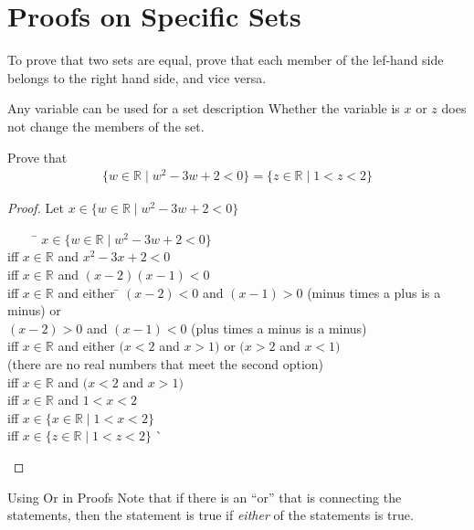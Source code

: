 \documentclass[../notes.tex]{subfiles}
\begin{document}
		\section{Proofs on Specific Sets}
			To prove that two sets are equal, prove that each member of the lef-hand side belongs to the right hand side, and vice versa.
			\begin{sidenote}{Any variable can be used for a set description}
				Whether the variable is $x$ or $z$ does not change the members of the set.
			\end{sidenote}
			\begin{example}
				Prove that
				\begin{align*}
					\{w \in \mathbb{R} \mid w^{2} - 3w + 2 < 0\} = \{z \in \mathbb{R} \mid 1 < z < 2\}
				\end{align*}
				\begin{proof}
					Let $x \in \{w \in \mathbb{R} \mid w^{2} - 3w + 2 < 0\}$
					\begin{tabbing}
						$\qquad$ \= $x \in \{w \in \mathbb{R} \mid w^{2} - 3w + 2 < 0\}$\\
						iff      \> $x \in \mathbb{R}$ and $x^{2} - 3x + 2 < 0$\\
						iff      \> $x \in \mathbb{R}$ and $(x - 2)(x - 1) < 0$\\
						iff      \> $x \in \mathbb{R}$ and either \= $(x - 2) < 0$ and $(x - 1) > 0$ (minus times a plus is a minus) or\\
						         \>                               \> $(x - 2) > 0$ and $(x - 1) < 0$ (plus times a minus is a minus)\\
						iff      \> $x \in \mathbb{R}$ and either \> $(x < 2$ and $x > 1)$ or $(x > 2$ and $x < 1)$\\
										 \>                               \> (there are no real numbers that meet the second option)\\
						iff      \> $x \in \mathbb{R}$ and $(x < 2$ and $x > 1)$\\
						iff      \> $x \in \mathbb{R}$ and $1 < x < 2$\\
						iff      \> $x \in \{x \in \mathbb{R} \mid 1 < x < 2\}$\\
						iff      \> $x \in \{z \in \mathbb{R} \mid 1 < z < 2\}$ \` \qedhere
					\end{tabbing}
				\end{proof}
			\end{example}
			\begin{sidenote}{Using Or in Proofs}
				Note that if there is an ``or'' that is connecting the statements, then the statement is true if \emph{either} of the statements is true.
			\end{sidenote}
\end{document}
